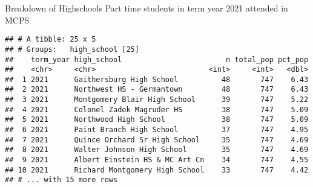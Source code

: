 \documentclass[]{article}
\newenvironment{Shaded}{\begin{snugshade}}{\end{snugshade}}
\newcommand{\DataTypeTok}[1]{\textcolor[rgb]{0.13,0.29,0.53}{#1}}
\newcommand{\DecValTok}[1]{\textcolor[rgb]{0.00,0.00,0.81}{#1}}
\newcommand{\KeywordTok}[1]{\textcolor[rgb]{0.13,0.29,0.53}{\textbf{#1}}}
\newcommand{\NormalTok}[1]{#1}
\newcommand{\OperatorTok}[1]{\textcolor[rgb]{0.81,0.36,0.00}{\textbf{#1}}}
\newcommand{\OtherTok}[1]{\textcolor[rgb]{0.56,0.35,0.01}{#1}}
\newcommand{\StringTok}[1]{\textcolor[rgb]{0.31,0.60,0.02}{#1}}
\begin{document}
Breakdown of Highschools Part time students in term year 2021 attended
in MCPS

\begin{Shaded}
\end{Shaded}

\begin{verbatim}
## # A tibble: 25 x 5
## # Groups:   high_school [25]
##    term_year high_school                        n total_pop pct_pop
##    <chr>     <chr>                          <int>     <int>   <dbl>
##  1 2021      Gaithersburg High School          48       747    6.43
##  2 2021      Northwest HS - Germantown         48       747    6.43
##  3 2021      Montgomery Blair High School      39       747    5.22
##  4 2021      Colonel Zadok Magruder HS         38       747    5.09
##  5 2021      Northwood High School             38       747    5.09
##  6 2021      Paint Branch High School          37       747    4.95
##  7 2021      Quince Orchard Sr High School     35       747    4.69
##  8 2021      Walter Johnson High School        35       747    4.69
##  9 2021      Albert Einstein HS & MC Art Cn    34       747    4.55
## 10 2021      Richard Montgomery High School    33       747    4.42
## # ... with 15 more rows
\end{verbatim}
\end{document}
